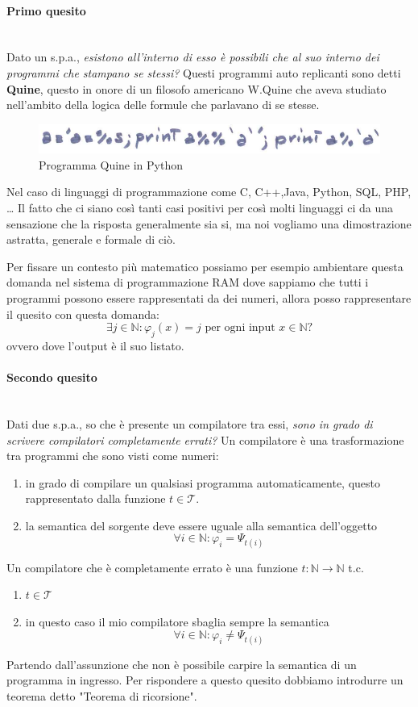 \documentclass{article}
\begin{document}
\paragraph{Primo quesito}\mbox{}\\
Dato un s.p.a., \textit{esistono all'interno di esso è possibili che al suo interno dei programmi
    che stampano se stessi?} Questi programmi auto replicanti sono detti \textbf{Quine}, questo in onore
di un filosofo americano W.Quine che aveva studiato nell'ambito della logica delle formule che
parlavano di se stesse.
\begin{figure}[H]
    \centering
    \includegraphics[scale=0.5]{images/python.png}
    \caption{Programma Quine in Python}
\end{figure}
Nel caso di linguaggi di programmazione come C, C++,Java, Python, SQL, PHP, \dots
Il fatto che ci siano così tanti casi positivi per così molti linguaggi ci da una sensazione
che la risposta generalmente sia si, ma noi vogliamo una dimostrazione astratta, generale e
formale di ciò.

Per fissare un contesto più matematico possiamo per esempio ambientare questa domanda nel
sistema di programmazione RAM dove sappiamo che tutti i programmi possono essere rappresentati
da dei numeri, allora posso rappresentare il quesito con questa domanda:
$$\exists j\in\mathbb{N}:\varphi_j(x)=j\text{ per ogni input }x\in\mathbb{N}?$$
ovvero dove l'output è il suo listato.

\paragraph{Secondo quesito}\mbox{}\\
Dati due s.p.a., so che è presente un compilatore tra essi, \textit{sono in grado di scrivere
    compilatori completamente errati?} Un compilatore è una trasformazione tra programmi che sono
visti come numeri:
\begin{enumerate}
    \item in grado di compilare un qualsiasi programma automaticamente, questo rappresentato
          dalla funzione $t\in\mathcal{T}$.
    \item la semantica del sorgente deve essere uguale alla semantica dell'oggetto
          $$\forall i\in\mathbb{N}:\varphi_i=\Psi_{t(i)}$$
\end{enumerate}
Un compilatore che è completamente errato è una funzione $t:\mathbb{N}\rightarrow\mathbb{N}$ t.c.
\begin{enumerate}
    \item $t\in\mathcal{T}$
    \item in questo caso il mio compilatore sbaglia sempre la semantica
          $$\forall i\in\mathbb{N}:\varphi_i\neq\Psi_{t(i)}$$
\end{enumerate}
Partendo dall'assunzione che non è possibile carpire la semantica di un programma in ingresso.
Per rispondere a questo quesito dobbiamo introdurre un teorema detto "Teorema di ricorsione".
\end{document}
